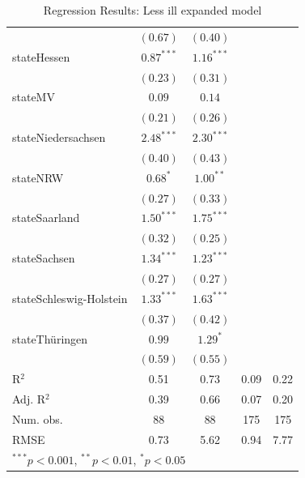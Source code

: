 \documentclass[12pt, a4paper, titlepage]{article}\usepackage[]{graphicx}\usepackage[]{color}
\begin{document}
\begin{table}
\begin{center}
{\begin{tabular}{l c c c c }
                          & $(0.67)$      & $(0.40)$     &              &            \\
stateHessen               & $0.87^{***}$  & $1.16^{***}$ &              &            \\
                          & $(0.23)$      & $(0.31)$     &              &            \\
stateMV                   & $0.09$        & $0.14$       &              &            \\
                          & $(0.21)$      & $(0.26)$     &              &            \\
stateNiedersachsen        & $2.48^{***}$  & $2.30^{***}$ &              &            \\
                          & $(0.40)$      & $(0.43)$     &              &            \\
stateNRW                  & $0.68^{*}$    & $1.00^{**}$  &              &            \\
                          & $(0.27)$      & $(0.33)$     &              &            \\
stateSaarland             & $1.50^{***}$  & $1.75^{***}$ &              &            \\
                          & $(0.32)$      & $(0.25)$     &              &            \\
stateSachsen              & $1.34^{***}$  & $1.23^{***}$ &              &            \\
                          & $(0.27)$      & $(0.27)$     &              &            \\
stateSchleswig-Holstein   & $1.33^{***}$  & $1.63^{***}$ &              &            \\
                          & $(0.37)$      & $(0.42)$     &              &            \\
stateThüringen            & $0.99$        & $1.29^{*}$   &              &            \\
                          & $(0.59)$      & $(0.55)$     &              &            \\
\hline
R$^2$                     & 0.51          & 0.73         & 0.09         & 0.22       \\
Adj. R$^2$                & 0.39          & 0.66         & 0.07         & 0.20       \\
Num. obs.                 & 88            & 88           & 175          & 175        \\
RMSE                      & 0.73          & 5.62         & 0.94         & 7.77       \\
\hline
\multicolumn{5}{l}{\scriptsize{$^{***}p<0.001$, $^{**}p<0.01$, $^*p<0.05$}}
\end{tabular}
}
\caption{Regression Results: Less ill expanded model}
\label{expandLessIll}
\end{center}
\end{table}
\end{document}
